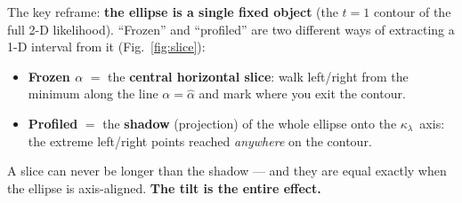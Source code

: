 \documentclass[11pt]{article}
\newcommand{\kl}{\ensuremath{\kappa_\lambda}}
\begin{document}
The key reframe: \textbf{the ellipse is a single fixed object} (the $t{=}1$ contour of the full 2-D
likelihood). ``Frozen'' and ``profiled'' are two different ways of extracting a 1-D interval from it
(Fig.~\ref{fig:slice}):
\begin{itemize}
\item \textbf{Frozen $\alpha$} $=$ the \textbf{central horizontal slice}: walk left/right from the minimum
  along the line $\alpha=\hat\alpha$ and mark where you exit the contour.
\item \textbf{Profiled} $=$ the \textbf{shadow} (projection) of the whole ellipse onto the \kl\ axis: the
  extreme left/right points reached \emph{anywhere} on the contour.
\end{itemize}
A slice can never be longer than the shadow --- and they are equal exactly when the ellipse is axis-aligned.
\textbf{The tilt is the entire effect.}
\end{document}
